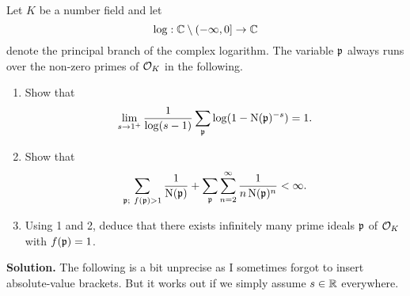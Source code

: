 \documentclass[a4paper,11pt]{article}
\begin{document}
Let $K$ be a number field and let 
\begin{equation*}
    \log: \mathbb{C} \setminus (-\infty, 0] \to \mathbb{C}
\end{equation*}
denote the principal branch of the complex logarithm. The variable $\mathfrak{p}$ always
runs over the non-zero primes of $\mathcal{O}_K$ in the following.
\begin{enumerate}
    \item Show that 
        \begin{equation*}
            \lim_{s \rightarrow 1^+} \frac{1}{\log(s-1)} \sum_{\mathfrak{p}} \log (1 -
            \operatorname{N}(\mathfrak{p})^{-s}) = 1.
        \end{equation*}
    \item Show that 
        \begin{equation*}
            \sum_{\mathfrak{p};\ f(\mathfrak{p})>1} \frac 1{\operatorname{N}(\mathfrak{p})} + \sum_{\mathfrak{p}} \sum_{n=2}^\infty \frac 1{n \operatorname{N}(\mathfrak{p})^n} < \infty.
        \end{equation*}
    \item Using 1 and 2, deduce that there exists infinitely many prime ideals $\mathfrak{p}$ of $\mathcal{O}_K$ with 
        $f(\mathfrak{p})=1$. 
\end{enumerate}
\textbf{Solution.}
The following is a bit unprecise as I sometimes forgot to insert absolute-value
brackets. But it works out if we simply assume $s \in \mathbb{R}$ everywhere.
\end{document}
